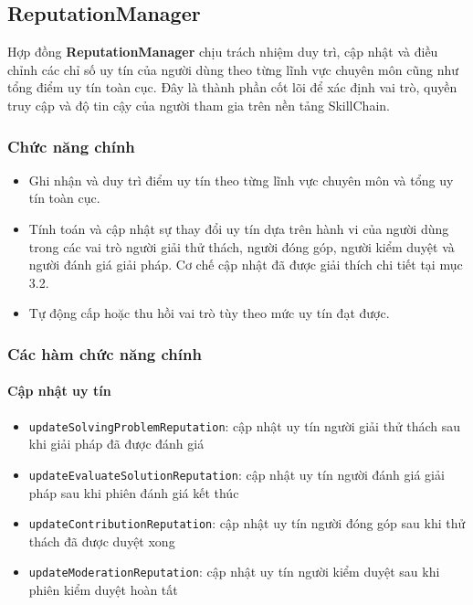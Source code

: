 \subsection{ReputationManager}

Hợp đồng \textbf{ReputationManager} chịu trách nhiệm duy trì, cập nhật và điều chỉnh các chỉ số uy tín của người dùng theo từng lĩnh vực chuyên môn cũng như tổng điểm uy tín toàn cục.
Đây là thành phần cốt lõi để xác định vai trò, quyền truy cập và độ tin cậy của người tham gia trên nền tảng SkillChain.

\subsubsection{Chức năng chính}

\begin{itemize}
  \item Ghi nhận và duy trì điểm uy tín theo từng lĩnh vực chuyên môn và tổng uy tín toàn cục.
  \item Tính toán và cập nhật sự thay đổi uy tín dựa trên hành vi của người dùng trong các vai trò người giải thử thách, người đóng góp, người kiểm duyệt và người đánh giá giải pháp. Cơ chế cập nhật đã được giải thích chi tiết tại mục 3.2.
  \item Tự động cấp hoặc thu hồi vai trò tùy theo mức uy tín đạt được.
\end{itemize}

\subsubsection{Các hàm chức năng chính}

\paragraph{Cập nhật uy tín}

\begin{itemize}
  \item \texttt{updateSolvingProblemReputation}: cập nhật uy tín người giải thử thách sau khi giải pháp đã được đánh giá
  \item \texttt{updateEvaluateSolutionReputation}: cập nhật uy tín người đánh giá giải pháp sau khi phiên đánh giá kết thúc
  \item \texttt{updateContributionReputation}: cập nhật uy tín người đóng góp sau khi thử thách đã được duyệt xong
  \item \texttt{updateModerationReputation}: cập nhật uy tín người kiểm duyệt sau khi phiên kiểm duyệt hoàn tất
\end{itemize}

